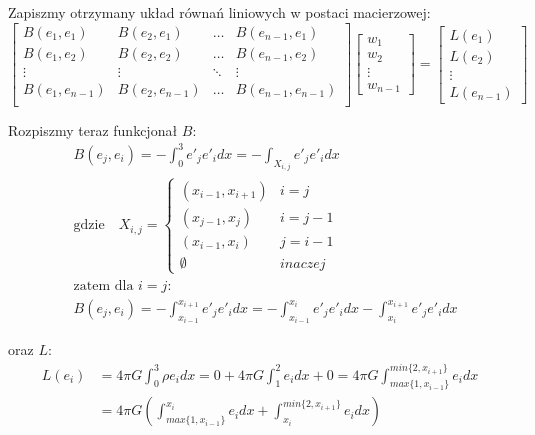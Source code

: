 \documentclass[11pt,a4paper]{article}
\begin{document}
Zapiszmy otrzymany układ równań liniowych w postaci macierzowej:
\begin{equation}
    \begin{bmatrix}
        B(e_1, e_1) & B(e_2, e_1) & \dots & B(e_{n - 1}, e_1) \\
        B(e_1, e_2) & B(e_2, e_2) & \dots & B(e_{n - 1}, e_2) \\
        \vdots & \vdots & \ddots & \vdots \\
        B(e_1, e_{n - 1}) & B(e_2, e_{n - 1}) & \dots & B(e_{n - 1}, e_{n - 1}) \\
    \end{bmatrix}
    \begin{bmatrix}
        w_1 \\ w_2 \\ \vdots \\ w_{n - 1}
    \end{bmatrix}
    =
    \begin{bmatrix}
        L(e_1) \\ L(e_2) \\ \vdots \\ L(e_{n - 1})
    \end{bmatrix}
\end{equation}

Rozpiszmy teraz funkcjonał $B$:
\begin{equation}
    \begin{split}
        &B(e_j, e_i) = -\int_{0}^{3} e'_j e'_i dx = -\int_{X_{i,j}} e'_j e'_i dx\\
        &\text{gdzie} \quad X_{i, j} = 
        \begin{cases}
            (x_{i - 1}, x_{i + 1}) & i = j \\
            (x_{j - 1}, x_j) & i = j - 1 \\
            (x_{i - 1}, x_i) & j = i - 1 \\
            \emptyset & inaczej
        \end{cases} \\
        &\text{zatem dla } i = j:\\
        &B(e_j, e_i) = -\int_{x_{i - 1}}^{x_{i + 1}} e'_j e'_i dx 
        = -\int_{x_{i - 1}}^{x_i} e'_j e'_i dx  - \int_{x_i}^{x_{i + 1}} e'_j e'_i dx 
    \end{split}
\end{equation}

oraz $L$:
\begin{equation}
    \begin{split}
        L(e_i) &= 4\pi G \int_{0}^{3}\rho e_i dx 
        = 0 + 4\pi G \int_{1}^{2} e_i dx + 0 
        = 4\pi G \int_{max\{1, x_{i - 1}\}}^{min\{2, x_{i + 1}\}} e_i dx\\
        &= 4\pi G (\int_{max\{1, x_{i - 1}\}}^{x_i} e_i dx + \int_{x_i}^{min\{2, x_{i + 1}\}} e_i dx)
    \end{split}
\end{equation}
\end{document}
